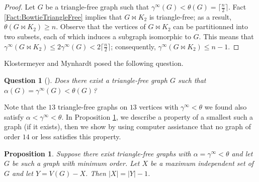 \documentclass[11pt]{article}
\newtheorem{que}[thm]{Question}
\newtheorem{prop}[thm]{Proposition}
\begin{document}
	\begin{proof}
		Let $G$ be a triangle-free graph such that $\gamma^\infty(G)<\theta(G)=\lceil \frac{n}{2} \rceil$. Fact \ref{Fact:BowtieTriangleFree} implies that $G \bowtie K_2$ is triangle-free; as a result, $\theta(G \bowtie K_2) \geq n$. Observe that the vertices of $G \bowtie K_2$ can be partitionned into two subsets, each of which induces a subgraph isomorphic to $G$. This means that $\gamma^\infty(G \bowtie K_2) \leq 2 \gamma^\infty(G)<2 \lceil \frac{n}{2} \rceil$; consequently, $\gamma^\infty(G \bowtie K_2) \leq n-1$.
	\end{proof}		

	Klostermeyer and Mynhardt \cite{klostermeyer2015domination} posed the following question.
	
	\begin{que} [\cite{klostermeyer2015domination}] \label{Conjecture:AlphaTheta}
		Does there exist a triangle-free graph $G$ such that $\alpha(G)=\gamma^\infty(G)<\theta(G)$?
	\end{que}

	Note that the $13$ triangle-free graphs on $13$ vertices with $\gamma^\infty<\theta$ we found also satisfy $\alpha<\gamma^\infty<\theta$. In Proposition \ref{Proposition:TriangleFree}, we describe a property of a smallest such a graph (if it exists), then we show by using computer assistance that no graph of order $14$ or less satisfies this property.
	
	\begin{prop} \label{Proposition:TriangleFree}
		Suppose there exist triangle-free graphs with $\alpha=\gamma^\infty<\theta$ and let $G$ be such a graph with minimum order. Let $X$ be a maximum independent set of $G$ and let $Y=V(G)-X$. Then $|X|=|Y|-1$.
	\end{prop}
	
\end{document}

